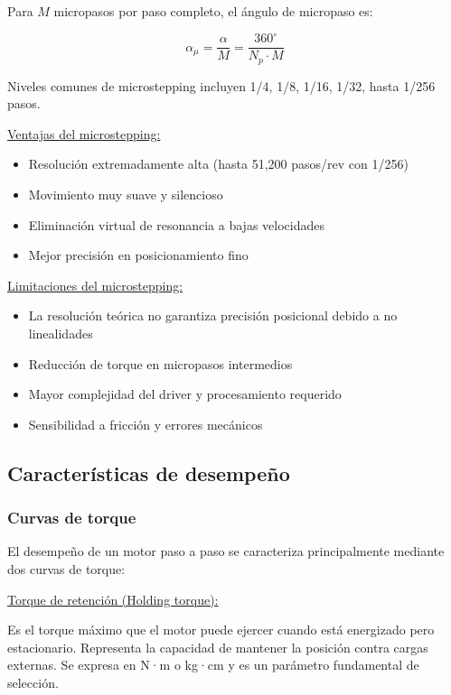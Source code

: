 Para $M$ micropasos por paso completo, el ángulo de micropaso es:

\begin{equation}
\alpha_{\mu} = \frac{\alpha}{M} = \frac{360^\circ}{N_p \cdot M}
\end{equation}

Niveles comunes de microstepping incluyen 1/4, 1/8, 1/16, 1/32, hasta 1/256 pasos.

\underline{Ventajas del microstepping:}

\begin{itemize}
    \item Resolución extremadamente alta (hasta 51,200 pasos/rev con 1/256)
    \item Movimiento muy suave y silencioso
    \item Eliminación virtual de resonancia a bajas velocidades
    \item Mejor precisión en posicionamiento fino
\end{itemize}

\underline{Limitaciones del microstepping:}

\begin{itemize}
    \item La resolución teórica no garantiza precisión posicional debido a no linealidades
    \item Reducción de torque en micropasos intermedios
    \item Mayor complejidad del driver y procesamiento requerido
    \item Sensibilidad a fricción y errores mecánicos
\end{itemize}

\subsection{Características de desempeño}

\subsubsection{Curvas de torque}

El desempeño de un motor paso a paso se caracteriza principalmente mediante dos curvas de torque:

\underline{Torque de retención (Holding torque):}

Es el torque máximo que el motor puede ejercer cuando está energizado pero estacionario. Representa la capacidad de mantener la posición contra cargas externas. Se expresa en N·m o kg·cm y es un parámetro fundamental de selección.

